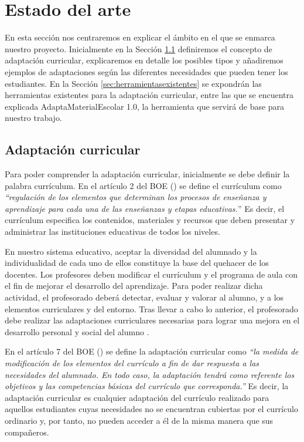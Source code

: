 \chapter{Estado del arte}
\label{cap:estadoDelArte}
En esta sección nos centraremos en explicar el ámbito en el que se enmarca nuestro proyecto. Inicialmente en la Sección \ref{cap:adaptacion} definiremos el concepto de adaptación curricular, explicaremos en detalle los posibles tipos y añadiremos ejemplos de adaptaciones según las diferentes necesidades que pueden tener los estudiantes. En la Sección \ref{sec:herramientasexistentes}  se expondrán las herramientas existentes para la adaptación curricular, entre las que se encuentra explicada AdaptaMaterialEscolar 1.0, la herramienta que servirá de base para nuestro trabajo.

\section{Adaptación curricular}\label{cap:adaptacion}
Para poder comprender la adaptación curricular, inicialmente se debe definir la palabra currículum. En el artículo 2 del BOE (\citeyear[p.5]{BOE2}) se define el currículum como \textit{``regulación de los elementos que determinan los procesos de enseñanza y aprendizaje para cada una de las enseñanzas y etapas educativas.}'' Es decir, el currículum especifica los contenidos, materiales y recursos que deben presentar y administrar las instituciones educativas de todos los niveles.

En nuestro sistema educativo, aceptar la diversidad del alumnado y la individualidad de cada uno de ellos constituye la base del quehacer de los docentes. Los profesores deben modificar el currículum y el programa de aula con el fin de mejorar el desarrollo del aprendizaje. Para poder realizar dicha actividad, el profesorado deberá detectar, evaluar y valorar al alumno, y a los elementos curriculares y del entorno. Tras llevar a cabo lo anterior, el profesorado debe realizar las adaptaciones curriculares necesarias para lograr una mejora en el desarrollo personal y social del alumno \citep*{adaptacionIntro}.

En el artículo 7 del BOE (\citeyear[p.7]{BOE}) se define la adaptación curricular como \textit{``la medida de modificación de los elementos del currículo a fin de dar respuesta a las necesidades del alumnado. En todo caso, la adaptación tendrá como referente los objetivos y las competencias básicas del currículo que corresponda.''} Es decir, la adaptación curricular es cualquier adaptación del currículo realizado para aquellos estudiantes cuyas necesidades no se encuentran cubiertas por el currículo ordinario y, por tanto, no pueden acceder a él de la misma manera que sus compañeros.

